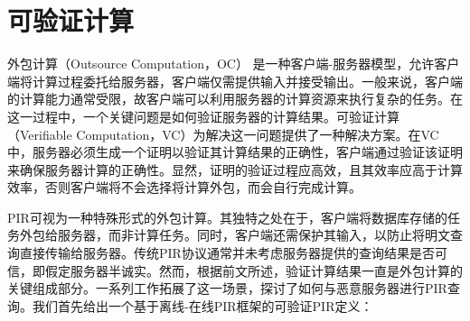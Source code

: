 \section{可验证计算}
外包计算（Outsource Computation，OC）\cite{USENIX:GreHohWat11, C:ChuKalVad10} 是一种客户端-服务器模型，允许客户端将计算过程委托给服务器，客户端仅需提供输入并接受输出。一般来说，客户端的计算能力通常受限，故客户端可以利用服务器的计算资源来执行复杂的任务。在这一过程中，一个关键问题是如何验证服务器的计算结果。可验证计算（Verifiable Computation，VC）为解决这一问题提供了一种解决方案。在VC中，服务器必须生成一个证明以验证其计算结果的正确性，客户端通过验证该证明来确保服务器计算的正确性。显然，证明的验证过程应高效，且其效率应高于计算效率，否则客户端将不会选择将计算外包，而会自行完成计算。

PIR可视为一种特殊形式的外包计算。其独特之处在于，客户端将数据库存储的任务外包给服务器，而非计算任务。同时，客户端还需保护其输入，以防止将明文查询直接传输给服务器。传统PIR协议通常并未考虑服务器提供的查询结果是否可信，即假定服务器半诚实。然而，根据前文所述，验证计算结果一直是外包计算的关键组成部分。一系列工作\cite{VeriSimplePIR, APIR, SVPIR18}拓展了这一场景，探讨了如何与恶意服务器进行PIR查询。我们首先给出一个基于离线-在线PIR框架的可验证PIR定义：

